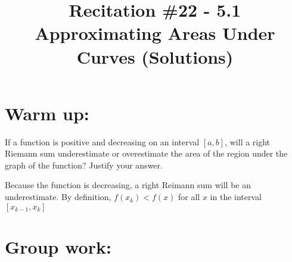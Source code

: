 \documentclass[nooutcomes]{ximera}
\title{Recitation \#22 - 5.1 Approximating Areas Under Curves (Solutions)}
\begin{document}
\begin{abstract}		\end{abstract}
\maketitle

\section{Warm up:} 
If a function is positive and decreasing on an interval $[a,b]$, will a right Riemann sum underestimate or overestimate the area of the region under the graph of the function? Justify your answer.
		\begin{freeResponse}
		Because the function is decreasing, a right Reimann sum will be an underestimate.  By definition, $f(x_k)< f(x)$ for all $x$ in the interval $[x_{k-1},x_k]$ 
		\end{freeResponse}	
		
		
		

	
	
	
	
	

\section{Group work:}
\end{document}

